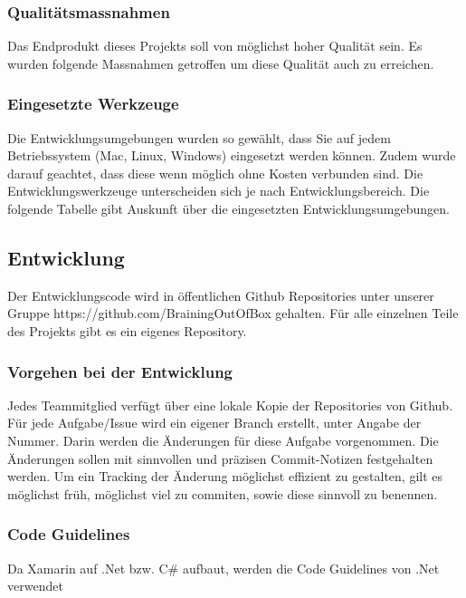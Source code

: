 \subsubsection{Qualitätsmassnahmen}
Das Endprodukt dieses Projekts soll von möglichst hoher Qualität sein. Es wurden folgende Massnahmen getroffen um diese Qualität auch zu erreichen.


\subsubsection{Eingesetzte Werkzeuge}
Die Entwicklungsumgebungen wurden so gewählt, dass Sie auf jedem Betriebssystem (Mac, Linux, Windows) eingesetzt werden können. Zudem wurde darauf geachtet, dass diese wenn möglich ohne Kosten verbunden sind. Die Entwicklungswerkzeuge unterscheiden sich je nach Entwicklungsbereich. Die folgende Tabelle gibt Auskunft über die eingesetzten Entwicklungsumgebungen.


\subsection{Entwicklung}
Der Entwicklungscode wird in öffentlichen Github Repositories unter unserer Gruppe https://github.com/BrainingOutOfBox gehalten. Für alle einzelnen Teile des Projekts gibt es ein eigenes Repository.


\subsubsection{Vorgehen bei der Entwicklung}
Jedes Teammitglied verfügt über eine lokale Kopie der Repositories von Github. Für jede Aufgabe/Issue wird ein eigener Branch erstellt, unter Angabe der Nummer. Darin werden die Änderungen für diese Aufgabe vorgenommen. Die Änderungen sollen mit sinnvollen und präzisen Commit-Notizen festgehalten werden. Um ein Tracking der Änderung möglichst effizient zu gestalten, gilt es möglichst früh, möglichst viel zu commiten, sowie diese sinnvoll zu benennen.

\subsubsection{Code Guidelines}
Da Xamarin auf .Net bzw. C\# aufbaut, werden die Code Guidelines von .Net verwendet

